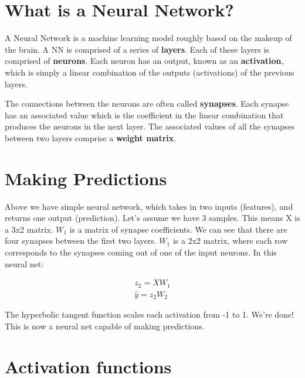 \documentclass[]{article}
\title{}
\author{}
\begin{document}
\maketitle

\begin{abstract}

\end{abstract}

\section{What is a Neural Network?}

A Neural Network is a machine learning model roughly based on the makeup of the brain. A NN is comprised of a series of \textbf{layers}. Each of these layers is comprised of \textbf{neurons}. Each neuron has an output, known as an \textbf{activation}, which is simply a linear combination of the outputs (activations) of the previous layers.

The connections between the neurons are often called \textbf{synapses}. Each synapse has an associated value which is the coefficient in the linear combination that produces the neurons in the next layer. The associated values of all the synapses between two layers comprise a \textbf{weight matrix}.

\section{Making Predictions}

Above we have simple neural network, which takes in two inputs (features), and returns one output (prediction). Let's assume we have 3 samples. This means X is a 3x2 matrix. $W_1$ is a matrix of synapse coefficients. We can see that there are four synapses between the first two layers. $W_1$ is a 2x2 matrix, where each row corresponds to the synapses coming out of one of the input neurons. In this neural net:

\begin{gather}
	z_2 = X W_1\\
	\hat{y} = z_2 W_2
\end{gather}

The hyperbolic tangent function scales each activation from -1 to 1. We're done! This is now a neural net capable of making predictions.

\section{Activation functions}
\end{document}
